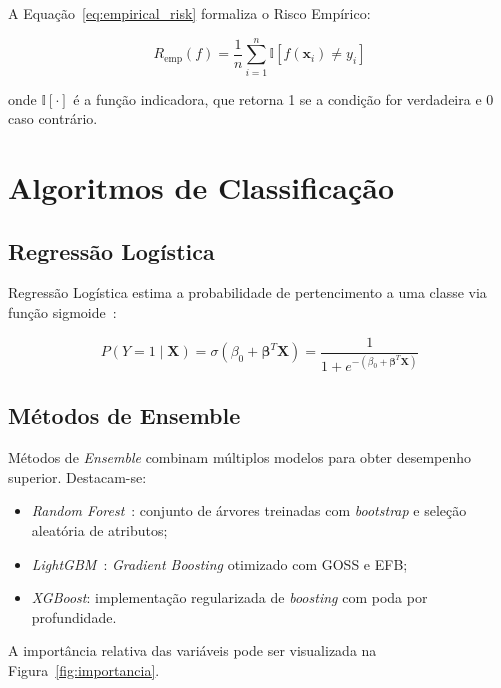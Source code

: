 \documentclass[
    12pt,
    oneside,
    a4paper,
    english,
    brazilian
    ]{abntex2}
\numberwithin{equation}{chapter}
\begin{document}
A Equação~\ref{eq:empirical_risk} formaliza o Risco Empírico:

\begin{equation}
    R_{\text{emp}}(f) = \frac{1}{n} \sum_{i=1}^n \mathbb{I}[f(\mathbf{x}_i) \neq y_i]
    \label{eq:empirical_risk}
\end{equation}

\noindent onde $\mathbb{I}[\cdot]$ é a função indicadora, que retorna 1 se a condição for verdadeira e 0 caso contrário.

\section{Algoritmos de Classificação}

\subsection{Regressão Logística}

Regressão Logística estima a probabilidade de pertencimento a uma classe via função sigmoide~\cite{geron2022}:

\begin{equation}
    P(Y=1 \mid \mathbf{X}) = \sigma(\beta_0 + \boldsymbol{\beta}^T\mathbf{X}) = \frac{1}{1 + e^{-(\beta_0 + \boldsymbol{\beta}^T\mathbf{X})}}
    \label{eq:logistic_diss}
\end{equation}

\subsection{Métodos de Ensemble}

Métodos de \textit{Ensemble} combinam múltiplos modelos para obter desempenho superior. Destacam-se:
\begin{itemize}
    \item \textit{Random Forest}~\cite{breiman2001}: conjunto de árvores treinadas com \textit{bootstrap} e seleção aleatória de atributos;
    \item \textit{LightGBM}~\cite{ke2017lightgbm}: \textit{Gradient Boosting} otimizado com GOSS e EFB;
    \item \textit{XGBoost}: implementação regularizada de \textit{boosting} com poda por profundidade.
\end{itemize}

A importância relativa das variáveis pode ser visualizada na Figura~\ref{fig:importancia}.
\end{document}

